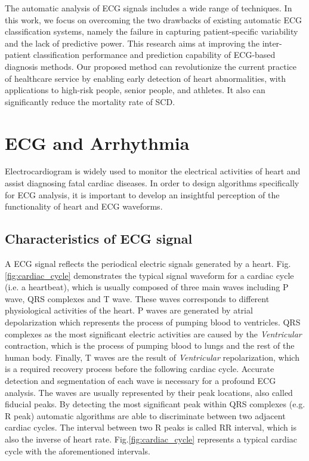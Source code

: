 The automatic analysis of ECG signals includes a wide range of techniques. In this work, we focus on overcoming the two drawbacks of existing automatic ECG classification systems, namely the failure in capturing patient-specific variability and the lack of predictive power.%
This research aims at improving the inter-patient classification performance and prediction capability of ECG-based diagnosis methods. Our proposed method can revolutionize the current practice of healthcare service by enabling early detection of heart abnormalities, with applications to high-risk people, senior people, and athletes. It also can significantly reduce the mortality rate of SCD. %

\section{ECG and Arrhythmia}

Electrocardiogram is widely used to monitor the electrical activities of heart and assist diagnosing fatal cardiac diseases. In order to design algorithms specifically for ECG analysis, it is important to develop an insightful perception of the functionality of heart and ECG waveforms.  

\subsection{Characteristics of ECG signal}

A ECG signal reflects the periodical electric signals generated by a heart. Fig.\ref{fig:cardiac_cycle} demonstrates the typical signal waveform for a cardiac cycle (i.e. a heartbeat), which is usually composed of three main waves including P wave, QRS complexes and T wave. These waves corresponds to different physiological activities of the heart. P waves are generated by atrial depolarization which represents the process of pumping blood to ventricles. QRS complexes as the most significant electric activities are caused by the \textit{Ventricular} contraction, which is the process of pumping blood to lungs and the rest of the human body. Finally, T waves are the result of \textit{Ventricular} repolarization, which is a required recovery process before the following cardiac cycle. Accurate detection and segmentation of each wave is necessary for a profound ECG analysis. The waves are usually represented by their peak locations, also called fiducial peaks. By detecting the most significant peak within QRS complexes (e.g. R peak) automatic algorithms are able to discriminate between two adjacent cardiac cycles. The interval between two R peaks is called RR interval, which is also the inverse of heart rate. Fig.\ref{fig:cardiac_cycle} represents a typical cardiac cycle with the aforementioned intervals.

